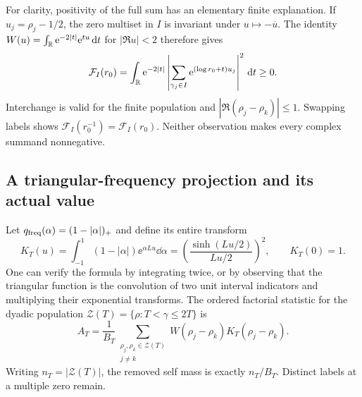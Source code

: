 For clarity, positivity of the full sum has an elementary finite
explanation. If $u_j=\rho_j-1/2$, the zero multiset in $I$ is
invariant under $u\mapsto-\overline u$. The identity
$W(u)=\int_\mathbb R\mathrm e^{-2|t|}\mathrm e^{tu}\,\mathrm d t$ for $|\Re u|<2$
therefore gives
\begin{equation}\label{eq:arithmetic-gram}
 \mathcal F_I(r_0)=
 \int_\mathbb R\mathrm e^{-2|t|}
       \left|\sum_{\gamma_j\in I}
                   \mathrm e^{(\log r_0+t)u_j}\right|^2\,\mathrm d t\ge0.
\end{equation}
Interchange is valid for the finite population and
$|\Re(\rho_j-\rho_k)|\le1$.
Swapping labels shows
$\mathcal F_I(r_0^{-1})=\mathcal F_I(r_0)$.
Neither observation makes every complex summand nonnegative.

\subsection{A triangular-frequency projection and its actual value}

Let $q_{\rm freq}(\alpha)=(1-|\alpha|)_+$ and define its entire
transform
\begin{equation}\label{eq:fejer-transform}
 K_T(u)=\int_{-1}^1(1-|\alpha|)\ee^{\alpha Lu}\dd\alpha
       =\left(\frac{\sinh(Lu/2)}{Lu/2}\right)^2,\qquad K_T(0)=1.
\end{equation}
One can verify the formula by integrating twice, or by observing
that the triangular function is the convolution of two unit
interval indicators and multiplying their exponential transforms.
The ordered factorial statistic for the dyadic population
$\mathcal Z(T)=\{\rho:T<\gamma\le2T\}$ is
\begin{equation}\label{eq:A_T}
 A_T=\frac1{B_T}\sum_{\substack{\rho_j,\rho_k\in\mathcal Z(T)\\j\ne k}}
       W(\rho_j-\rho_k)K_T(\rho_j-\rho_k).
\end{equation}
Writing $n_T=|\mathcal Z(T)|$, the removed self mass is exactly
$n_T/B_T$. Distinct labels at a multiple zero remain.

